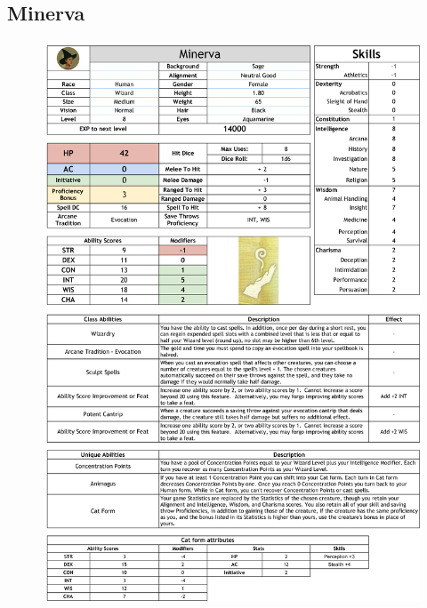 \subsection{Minerva}
\begin{figure}[H]
\includegraphics[max width=\textwidth]{../Pictures/Characters/Stat_sheets/Minerva_sheet.png}
\end{figure}


